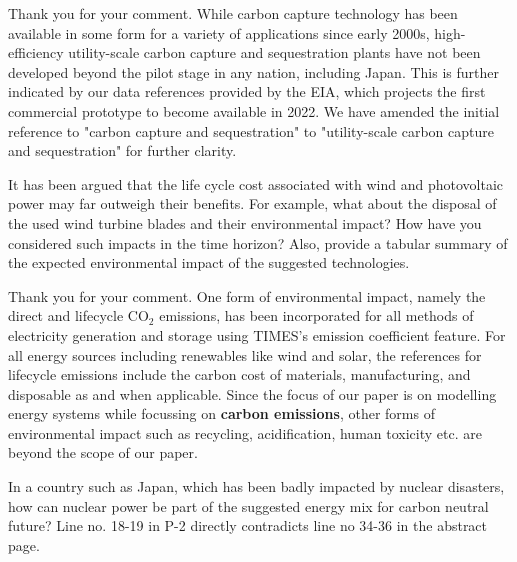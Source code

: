 \documentclass[answers,11pt]{exam}
\begin{document}
\begin{questions}
        \begin{solution}
                 Thank you for your comment. While carbon capture technology has been available in some form for a variety of applications since early 2000s, high-efficiency utility-scale carbon capture and sequestration plants have not been developed beyond the pilot stage in any nation, including Japan. This is further indicated by our data references provided by the EIA, which projects the first commercial prototype to become available in 2022. We have amended the initial reference to "carbon capture and sequestration" to "utility-scale carbon capture and sequestration" for further clarity.
                 
                 
        \end{solution}
        
      
                        \question It has been argued that the life cycle cost associated with wind and photovoltaic power may far outweigh  their benefits. For example, what about the disposal of the used wind turbine blades and their environmental impact? How have you considered such impacts in the time horizon? Also, provide a tabular summary of the expected environmental impact of the suggested technologies. 
        
        \begin{solution}
        
                 Thank you for your comment. One form of environmental impact, namely the direct and lifecycle CO$_2$ emissions, has been incorporated for all methods of electricity generation and storage using TIMES's emission coefficient feature. For all energy sources including renewables like wind and solar, the references for lifecycle emissions include the carbon cost of materials, manufacturing, and disposable as and when applicable. Since the focus of our paper is on modelling energy systems while focussing on \textbf{carbon emissions}, other forms of environmental impact such as recycling, acidification, human toxicity etc. are beyond the scope of our paper.
                 
                 
        \end{solution}

                        \question In a country such as Japan, which has been badly impacted by nuclear disasters, how can nuclear power be part of the suggested energy mix for carbon neutral future? Line no. 18-19 in P-2 directly contradicts line no 34-36 in the abstract page.
        

\end{questions}
\end{document}
